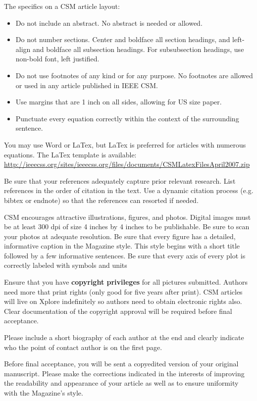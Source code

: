 The specifics on a CSM article layout:
\begin{itemize}
\item Do not include an abstract.  No abstract is needed or allowed.
\item Do not number sections.  Center and boldface all section headings, and left-align and boldface all subsection headings. For subsubsection headings, use non-bold font, left justified.
\item Do not use footnotes of any kind or for any purpose. No footnotes are allowed or used in any article published in IEEE CSM.
\item Use margins that are 1 inch on all sides, allowing for US size paper. 
\item Punctuate every equation correctly within the context of the surrounding sentence.
\end{itemize}

You may use Word or LaTex, but LaTex is preferred for articles with numerous equations. The LaTex template is available:\\
\url{http://ieeecss.org/sites/ieeecss.org/files/documents/CSMLatexFilesApril2007.zip }

Be sure that your references adequately capture prior relevant research. List references in the order of citation in the text. Use a dynamic citation process (e.g. bibtex or endnote) so that the references can resorted if needed.

CSM encourages attractive illustrations, figures, and photos.  Digital images must be at least 300 dpi of size 4 inches by 4 inches to be publishable. Be sure to scan your photos at adequate resolution. 
Be sure that every figure has a detailed, informative caption in the Magazine style.  This style begins with a short title followed by a few informative sentences. Be sure that every axis of every plot is correctly labeled with symbols and units

Ensure that you have \textbf{copyright privileges} for all pictures submitted. Authors need more that print rights (only good for five years after print). CSM articles will live on Xplore
indefinitely so authors need to obtain electronic rights also. Clear documentation of the copyright approval will be required before final acceptance. 

Please include a short biography of each author at the end and clearly indicate who the point of contact author is on the first page.

Before final acceptance, you will be sent a copyedited version of your original manuscript. Please make the corrections indicated in the interests of improving the readability and appearance of your article as well as to ensure uniformity with the Magazine’s style.

